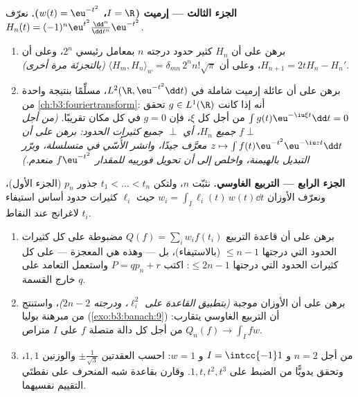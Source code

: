 \begin{problem}
\medskip
\noindent\textbf{الجزء الثالث --- إرميت ($I = \R$، $w(t) =
\eu^{-t^2}$).}
نعرّف $H_n(t) =
(-1)^n\eu^{t^2}\frac{\dd^n}{\dd t^n}\eu^{-t^2}$.
\begin{enumerate}[resume]
  \item برهن على أن $H_n$ كثير حدود درجته $n$ بمعامل رئيسي
        $2^n$، وعلى أن $H_{n+1} = 2tH_n -
        H_n'$، وعلى أن $\langle H_m, H_n\rangle_w =
        \delta_{mn}\,2^nn!\sqrt\pi$
        \emph{(بالتجزئة مرة أخرى)}.
  \item برهن على أن عائلة إرميت شاملة في $L^2(\R,
        \eu^{-t^2}\dd t)$، مسلِّمًا
        بنتيجة واحدة من \cref{ch:b3:fouriertransform}: أنه إذا كانت
        $g \in L^1(\R)$ تحقق $\int g(t)\eu^{-\iu\xi t}\dd t = 0$ من أجل كل $\xi$، فإن
        $g = 0$ في كل مكان تقريبًا. \emph{(من أجل $f \perp$ جميع $H_n$،
        أي $\perp$ جميع كثيرات الحدود: برهن على أن
        $z \mapsto \int
        f(t)\eu^{-t^2}\eu^{-\iu zt}\dd t$ معرَّف جيدًا، وانشر الأُسّي في متسلسلة، وبرّر
        التبديل بالهيمنة، واخلص إلى أن تحويل فورييه للمقدار
        $f\eu^{-t^2}$ منعدم.)}
\end{enumerate}

\medskip
\noindent\textbf{الجزء الرابع --- التربيع الغاوسي.} نثبّت $n$،
ولتكن $t_1 < \dots < t_n$ جذور $p_n$ (الجزء الأول)، ونعرّف الأوزان $w_i = \int_I \ell_i(t)\,w(t)\dd t$
حيث $\ell_i$ كثيرات حدود أساس استيفاء لاغرانج عند النقاط
$t_i$.
\begin{enumerate}[resume]
  \item برهن على أن قاعدة التربيع $Q(f) = \sum_iw_if(t_i)$ مضبوطة على كل
        كثيرات الحدود التي درجتها $\leq n - 1$ (بالاستيفاء)،
        بل --- وهذه هي المعجزة --- على كل كثيرات الحدود التي
        درجتها $\leq 2n - 1$: اكتب $P =
        qp_n + r$ واستعمل التعامد
        على خارج القسمة $q$.
  \item برهن على أن الأوزان موجبة \emph{(بتطبيق القاعدة على
        $\ell_i^2$، ودرجته $2n -
        2$)}، واستنتج من مبرهنة
        بوليا (\cref{exo:b3:banach:9}) أن التربيع الغاوسي يتقارب:
        $Q_n(f) \to \int_I fw$ من أجل كل دالة متصلة $f$ على $I$ متراص.
  \item من أجل $n = 2$ و $I = \intcc{-1}1$ و $w = 1$: احسب العقدتين
        $\pm\frac1{\sqrt3}$ والوزنين $1, 1$، وتحقق يدويًّا من الضبط على
        $1, t, t^2, t^3$. وقارن بقاعدة شبه المنحرف على نقطتَي
        التقييم نفسيهما.
\end{enumerate}


\end{problem}

